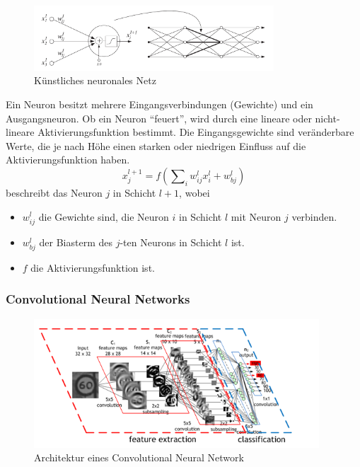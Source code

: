 \begin{figure}[ht]
  \centering
  \includegraphics[width=0.8\textwidth]{pics/neural-net.PNG}
  \caption[Künstliches neuronales Netz]{Künstliches neuronales Netz\cite{ref:verrelst}}
  \label{fig:ann}
\end{figure}
\noindent
Ein Neuron besitzt mehrere Eingangsverbindungen (Gewichte) und ein Ausgangsneuron. Ob ein Neuron "`feuert"', wird durch eine lineare oder nicht-lineare Aktivierungsfunktion bestimmt. Die Eingangsgewichte sind veränderbare Werte, die je nach Höhe einen starken oder niedrigen Einfluss auf die Aktivierungsfunktion haben.
\begin{equation}\label{equ:neuron}
x^{l+1}_{j}=f(\sum\nolimits_i w^l_{ij}x^l_i + w^l_{bj})
\end{equation}
beschreibt das Neuron $j$ in Schicht $l+1$, wobei
\begin{itemize}
	\item $w^l_{ij}$ die Gewichte sind, die Neuron $i$ in Schicht $l$ mit Neuron $j$ verbinden.
	\item $w^l_{bj}$ der Biasterm des $j$-ten Neurons in Schicht $l$ ist.
	\item $f$ die Aktivierungsfunktion ist.\cite{ref:verrelst}
\end{itemize} 

\subsubsection{Convolutional Neural Networks}\label{sec:sub:sub:cnn}
\begin{figure}[ht]
  \centering
  \includegraphics[width=0.95\textwidth]{pics/cnn.png}
  \caption[CNN]{Architektur eines Convolutional Neural Network\cite{ref:cnn-architecture}}
  \label{fig:cnn-architecture}
\end{figure}

